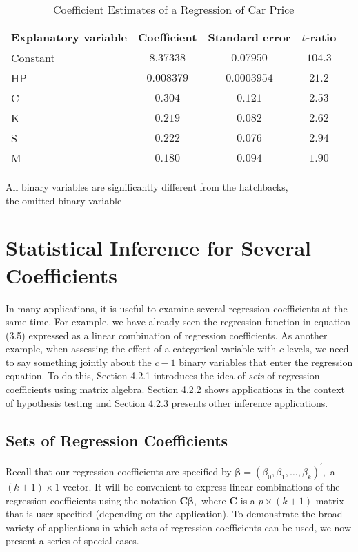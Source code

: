 \begin{table}[h]
 \caption{\label{T4:CarPriceRegression} Coefficient
Estimates of a Regression of Car Price}
\begin{tabular}{lccc}
\hline Explanatory variable & Coefficient & Standard error &
$t$-ratio
\\ \hline
Constant & $8.37338$ & $0.07950$ &$104.3$ \\
HP & $0.008379$ & $0.0003954$ & $21.2$ \\
C  & $0.304$ & $ 0.121$ & $2.53$ \\
K  & $0.219$ & $0.082$ & $2.62$ \\
S  & $0.222$ & $0.076$ & $2.94$ \\
M  & $0.180$ & $ 0.094$ & $1.90$ \\
 \hline
\end{tabular}

{\small All binary variables are significantly different from the
hatchbacks, \\
 the omitted binary variable}

\linetjed
\end{table}




\section{Statistical Inference for Several Coefficients}

In many applications, it is useful to examine several regression
coefficients at the same time. For example, we have already seen the
regression function in equation (3.5) expressed as a linear
combination of regression coefficients. As another example, when
assessing the effect of a categorical variable with $c$ levels, we
need to say something jointly about the $c-1$ binary variables that
enter the regression equation. To do this, Section 4.2.1 introduces
the idea of \emph{sets} of regression coefficients using matrix
algebra. Section 4.2.2 shows applications in the context of
hypothesis testing and Section 4.2.3 presents other inference
applications.


\subsection{Sets of Regression Coefficients}

Recall that our regression coefficients are specified by
$\boldsymbol \beta =\left( \beta_0, \beta_1, \ldots,\beta_k \right)
^{\prime },$ a $(k+1)\times 1$ vector. It will be convenient to
express linear combinations of the regression coefficients using the
notation $\mathbf{C} \boldsymbol \beta,$ where \textbf{C} is a
$p\times (k+1)$ matrix that is user-specified (depending on the
application). To demonstrate the broad variety of applications in
which sets of regression coefficients can be used, we now present a
series of special cases.

